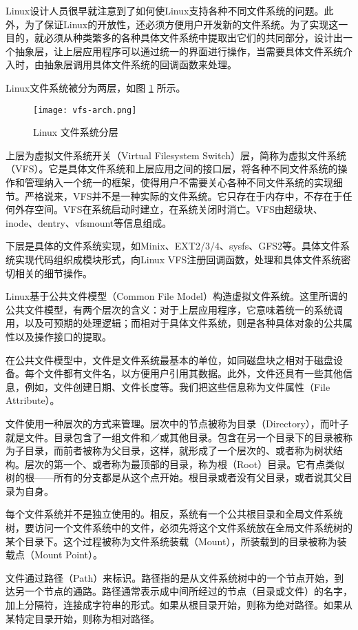 Linux设计人员很早就注意到了如何使Linux支持各种不同文件系统的问题。此外，为了保证Linux的开放性，还必须方便用户开发新的文件系统。为了实现这一目的，就必须从种类繁多的各种具体文件系统中提取出它们的共同部分，设计出一个抽象层，让上层应用程序可以通过统一的界面进行操作，当需要具体文件系统介入时，由抽象层调用具体文件系统的回调函数来处理。

Linux文件系统被分为两层，如图 \ref{fig:vfs-arch} 所示。

\begin{figure}[h]
	\centering
	\texttt{[image: vfs-arch.png]}
	\caption{Linux 文件系统分层}
	\label{fig:vfs-arch}
\end{figure}

上层为虚拟文件系统开关（Virtual Filesystem Switch）层，简称为虚拟文件系统（VFS）。它是具体文件系统和上层应用之间的接口层，将各种不同文件系统的操作和管理纳入一个统一的框架，使得用户不需要关心各种不同文件系统的实现细节。严格说来，VFS并不是一种实际的文件系统。它只存在于内存中，不存在于任何外存空间。VFS在系统启动时建立，在系统关闭时消亡。VFS由超级块、inode、dentry、vfsmount等信息组成。

下层是具体的文件系统实现，如Minix、EXT2/3/4、sysfs、GFS2等。具体文件系统实现代码组织成模块形式，向Linux VFS注册回调函数，处理和具体文件系统密切相关的细节操作。

Linux基于公共文件模型（Common File Model）构造虚拟文件系统。这里所谓的公共文件模型，有两个层次的含义：对于上层应用程序，它意味着统一的系统调用，以及可预期的处理逻辑；而相对于具体文件系统，则是各种具体对象的公共属性以及操作接口的提取。

在公共文件模型中，文件是文件系统最基本的单位，如同磁盘块之相对于磁盘设备。每个文件都有文件名，以方便用户引用其数据。此外，文件还具有一些其他信息，例如，文件创建日期、文件长度等。我们把这些信息称为文件属性（File Attribute）。

文件使用一种层次的方式来管理。层次中的节点被称为目录（Directory），而叶子就是文件。目录包含了一组文件和／或其他目录。包含在另一个目录下的目录被称为子目录，而前者被称为父目录，这样，就形成了一个层次的、或者称为树状结构。层次的第一个、或者称为最顶部的目录，称为根（Root）目录。它有点类似树的根——所有的分支都是从这个点开始。根目录或者没有父目录，或者说其父目录为自身。

每个文件系统并不是独立使用的。相反，系统有一个公共根目录和全局文件系统树，要访问一个文件系统中的文件，必须先将这个文件系统放在全局文件系统树的某个目录下。这个过程被称为文件系统装载（Mount），所装载到的目录被称为装载点（Mount Point）。

文件通过路径（Path）来标识。路径指的是从文件系统树中的一个节点开始，到达另一个节点的通路。路径通常表示成中间所经过的节点（目录或文件）的名字，加上分隔符，连接成字符串的形式。如果从根目录开始，则称为绝对路径。如果从某特定目录开始，则称为相对路径。

